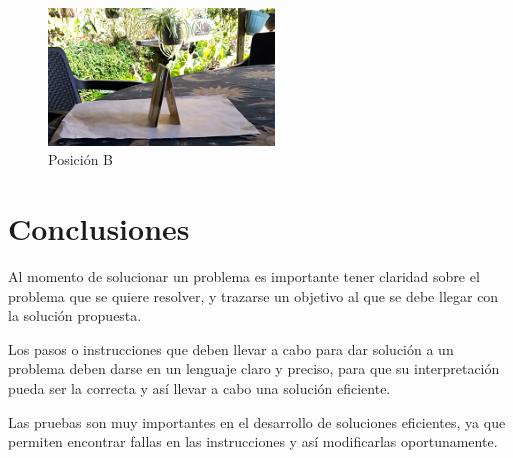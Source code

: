 \documentclass{article}
\begin{document}
\begin{figure}[h]
\includegraphics[width=6cm]{pos_b.png}
\centering
\caption{Posición B}
\label{fig:pos_b}
\end{figure}

\section{Conclusiones} \label{conclusiones}

Al momento de solucionar un problema es importante tener claridad sobre el problema que se quiere resolver,  y trazarse un objetivo al que se debe llegar con la solución propuesta.
\vspace{0.8cm}

Los pasos o instrucciones que deben llevar a cabo para dar solución a un problema deben darse en un lenguaje claro y preciso, para que su interpretación pueda ser la correcta y así llevar a cabo una solución eficiente.
\vspace{0.8cm}

Las pruebas son muy importantes en el desarrollo de soluciones eficientes, ya que permiten encontrar fallas en las instrucciones y así modificarlas oportunamente.
\end{document}
